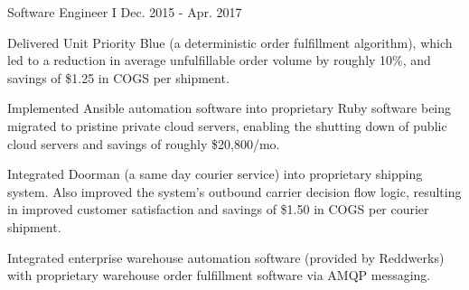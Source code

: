 \begin{cventries}
  \cventry
    {Software Engineer I} %
    {} %
    {} %
    {Dec. 2015 - Apr. 2017} %
    {
      \begin{cvitems} %
        \item {Delivered Unit Priority Blue (a deterministic order fulfillment algorithm), which led to a reduction in average unfulfillable order volume by roughly 10\%, and savings of \$1.25 in COGS per shipment.}
        \item {Implemented Ansible automation software into proprietary Ruby software being migrated to pristine private cloud servers, enabling the shutting down of public cloud servers and savings of roughly \$20,800/mo.}
        \item {Integrated Doorman (a same day courier service) into proprietary shipping system. Also improved the system's outbound carrier decision flow logic, resulting in improved customer satisfaction and savings of \$1.50 in COGS per courier shipment.}
        \item {Integrated enterprise warehouse automation software (provided by Reddwerks) with proprietary warehouse order fulfillment software via AMQP messaging.}
      \end{cvitems}
    }

\end{cventries}